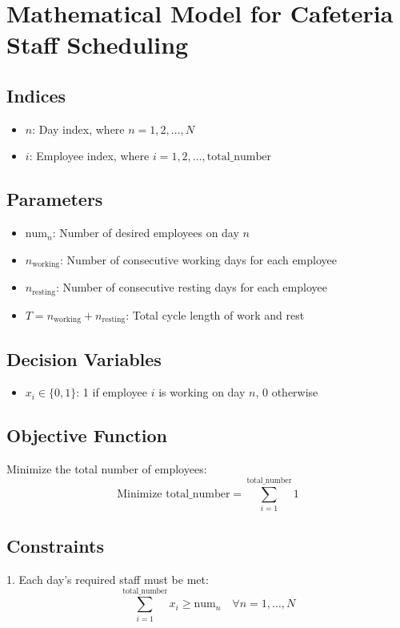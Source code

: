 \documentclass{article}
\begin{document}
\section*{Mathematical Model for Cafeteria Staff Scheduling}

\subsection*{Indices}
\begin{itemize}
    \item \( n \): Day index, where \( n = 1, 2, \ldots, N \)
    \item \( i \): Employee index, where \( i = 1, 2, \ldots, \text{total\_number} \)
\end{itemize}

\subsection*{Parameters}
\begin{itemize}
    \item \( \text{num}_n \): Number of desired employees on day \( n \)
    \item \( n_{\text{working}} \): Number of consecutive working days for each employee
    \item \( n_{\text{resting}} \): Number of consecutive resting days for each employee
    \item \( T = n_{\text{working}} + n_{\text{resting}} \): Total cycle length of work and rest
\end{itemize}

\subsection*{Decision Variables}
\begin{itemize}
    \item \( x_i \in \{0, 1\} \): 1 if employee \( i \) is working on day \( n \), 0 otherwise
\end{itemize}

\subsection*{Objective Function}
Minimize the total number of employees:
\[
\text{Minimize } \text{total\_number} = \sum_{i=1}^{\text{total\_number}} 1
\]

\subsection*{Constraints}
1. Each day's required staff must be met:
\[
\sum_{i=1}^{\text{total\_number}} x_i \geq \text{num}_n \quad \forall n = 1, \ldots, N
\]
\end{document}
